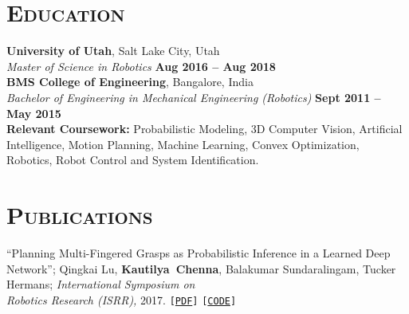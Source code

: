 \documentclass[margin, line]{resume}
\begin{document}
\begin{resume}
    \section{\mysidestyle \textsc{Education}}
    \textbf{University of Utah}, Salt Lake City, Utah %
    \\\vspace{1mm}%
    \textsl{Master of Science in Robotics} \hfill \textbf{ Aug 2016 -- Aug 2018}\\%
    \textbf{BMS College of Engineering}, Bangalore, India %
    \\\vspace{1mm}%
    \textsl{Bachelor of Engineering in Mechanical Engineering (Robotics)} \hfill \textbf{Sept 2011 -- May 2015}\\%
	\textbf{Relevant Coursework:} Probabilistic Modeling, 3D Computer Vision, Artificial Intelligence, Motion Planning, Machine Learning, Convex Optimization, Robotics, Robot Control and System Identification.


    
	\sectionline
    \section{\mysidestyle \textsc{Publications}}
     ``Planning Multi-Fingered Grasps as Probabilistic Inference in a Learned Deep Network''; Qingkai Lu,
     \mbox{\bf Kautilya Chenna}, Balakumar Sundaralingam, Tucker Hermans; \textit{International Symposium on\\ Robotics Research (ISRR),} 2017. \texttt{[\href{http://www.cs.utah.edu/~thermans/papers/lu-isrr2017-deep-multifinger-grasping.pdf}{PDF}]} \texttt{[\href{https://robot-learning.cs.utah.edu/project/grasp\_inference}{CODE}]}%


    

\end{resume}
\end{document}
